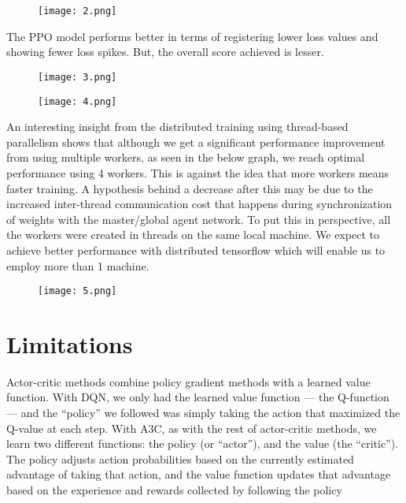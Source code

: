 \documentclass[conference]{IEEEtran}
\begin{document}
\begin{figure}[htp]
    \centering
    \texttt{[image: 2.png]}
\end{figure}

The PPO model performs better in terms of registering lower loss values and showing fewer loss spikes. But, the overall score achieved is lesser.

\begin{figure}[htp]
    \centering
    \texttt{[image: 3.png]}
\end{figure}

\begin{figure}[htp]
    \centering
    \texttt{[image: 4.png]}
\end{figure}

An interesting insight from the distributed training using thread-based parallelism shows that although we get a significant performance improvement from using multiple workers, as seen in the below graph, we reach optimal performance using 4 workers. This is against the idea that more workers means faster training. A hypothesis behind a decrease after this may be due to the increased inter-thread communication cost that happens during synchronization of weights with the master/global agent network. To put this in perspective, all the workers were created in threads on the same local machine. We expect to achieve better performance with distributed tensorflow which will enable us to employ more than 1 machine.

\begin{figure}[htp]
    \centering
    \texttt{[image: 5.png]}
\end{figure}

\section{Limitations}

Actor-critic methods combine policy gradient methods with a learned value function. With DQN, we only had the learned value function — the Q-function — and the “policy” we followed was simply taking the action that maximized the Q-value at each step. With A3C, as with the rest of actor-critic methods, we learn two different functions: the policy (or “actor”), and the value (the “critic”). The policy adjusts action probabilities based on the currently estimated advantage of taking that action, and the value function updates that advantage based on the experience and rewards collected by following the policy
\end{document}
